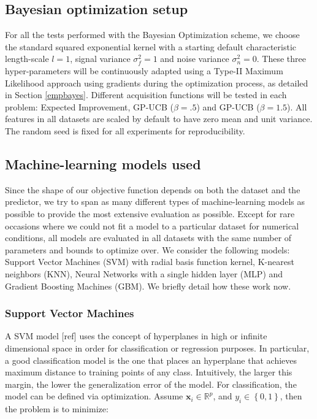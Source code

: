 \documentclass[10pt,a4paper,twoside]{book}
\begin{document}
\subsection{Bayesian optimization setup}

For all the tests performed with the Bayesian Optimization scheme, we choose the standard squared exponential kernel with a starting default characteristic length-scale $l=1$, signal variance $\sigma_f^2=1$ and noise variance $\sigma_n^2 = 0$. These three hyper-parameters will be continuously adapted using a Type-II Maximum Likelihood approach using gradients during the optimization process, as detailed in Section \ref{empbayes}. Different acquisition functions will be tested in each problem: Expected Improvement, GP-UCB ($\beta= .5$) and GP-UCB ($\beta = 1.5$). All features in all datasets are scaled by default to have zero mean and unit variance. The random seed is fixed for all experiments for reproducibility.

\subsection{Machine-learning models used}

Since the shape of our objective function depends on both the dataset and the predictor, we try to span as many different types of machine-learning models as possible to provide the most extensive evaluation as possible. Except for rare occasions where we could not fit a model to a particular dataset for numerical conditions, all models are evaluated in all datasets with the same number of parameters and bounds to optimize over. We consider the following models: Support Vector Machines (SVM) with radial basis function kernel, K-nearest neighbors (KNN), Neural Networks with a single hidden layer (MLP) and Gradient Boosting Machines (GBM). We briefly detail how these work now.

\subsubsection{Support Vector Machines}

A SVM model [ref] uses the concept of hyperplanes in high or infinite dimensional space in order for classification or regression purposes. In particular, a good classification model is the one that places an hyperplane that achieves maximum distance to training points of any class. Intuitively, the larger this margin, the lower the generalization error of the model. For classification, the model can be defined via optimization. Assume $\boldsymbol{x}_i \in \mathbb{R}^p$, and $y_i \in \left\lbrace 0, 1 \right\rbrace$, then the problem is to minimize:
\end{document}
